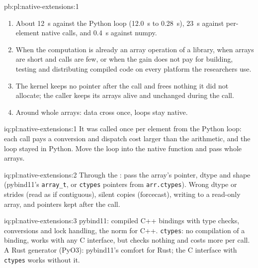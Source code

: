 \begin{solution}{pb:pl:native-extensions:1}
\begin{enumerate}
whole arrays both native averages beat numpy at every length measured and the Rust lookup from about a thousand elements, and moving the
loop instead of the body turns a 24-second day of per-element calls into 0.3~s.
\item About 12~s against the Python loop (12.0~s to 0.28~s), 23~s against per-element native calls, and 0.4~s against numpy.
\item When the computation is already an array operation of a library, when arrays are short and calls are few, or when the gain does
not pay for building, testing and distributing compiled code on every platform the researchers use.
\item The kernel keeps no pointer after the call and frees nothing it did not allocate; the caller keeps its arrays alive and unchanged
during the call.
\item Around whole arrays: data cross once, loops stay native.
\end{enumerate}
\end{solution}

\begin{solution}{iq:pl:native-extensions:1}
It was called once per element from the Python loop: each call pays a conversion and dispatch cost larger than the arithmetic, and the
loop stayed in Python. Move the loop into the native function and pass whole arrays.
\end{solution}

\begin{solution}{iq:pl:native-extensions:2}
Through the : pass the array's pointer, dtype and shape (pybind11's \texttt{array\_t}, or \texttt{ctypes} pointers from
\texttt{arr.ctypes}). Wrong dtype or strides (read as if contiguous), silent copies (forcecast), writing to a read-only array, and pointers
kept after the call.
\end{solution}

\begin{solution}{iq:pl:native-extensions:3}
pybind11: compiled C++ bindings with type checks, conversions and lock handling, the norm for C++. \texttt{ctypes}: no compilation of a
binding, works with any C interface, but checks nothing and costs more per call. A Rust generator (PyO3): pybind11's comfort for Rust;
the C interface with \texttt{ctypes} works without it.
\end{solution}

